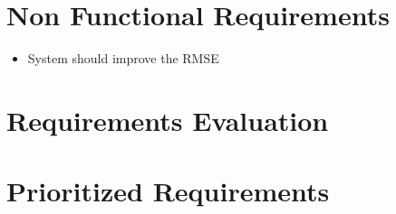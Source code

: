 \section{Non Functional Requirements}
\begin{itemize}
  \item System should improve the RMSE
\end{itemize}



\section{Requirements Evaluation}



\section{Prioritized Requirements}

